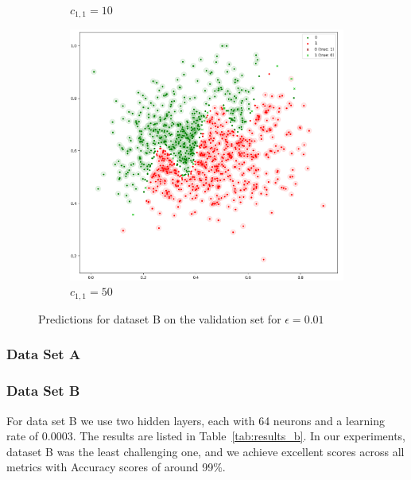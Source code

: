 \documentclass[acmsmall,nonacm]{acmart}
\begin{document}
\begin{figure}[H]
\begin{subfigure}[b]{0.32\textwidth}
      \caption{$c_{1, 1} = 10$}
    \end{subfigure}
    \begin{subfigure}[b]{0.32\textwidth}
      \includegraphics[width=\textwidth]{assets/b-val-cost50-eps0_01}
      \caption{$c_{1, 1} = 50$}
    \end{subfigure}
    \caption{Predictions for dataset B on the validation set for $\epsilon = 0.01$}
    \label{fig:b_val_results}
  \end{figure}

\subsubsection*{Data Set A}

\subsubsection*{Data Set B}
For data set B we use two hidden layers, each with 64 neurons and a learning rate of 0.0003. The results are listed in Table~\ref{tab:results_b}. In our experiments, dataset B was the least challenging one, and we achieve excellent scores across all metrics with Accuracy scores of around 99\%. 
\end{document}
